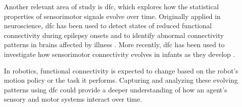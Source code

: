 Another relevant area of study is \ac{dfc}, which explores how the statistical properties of sensorimotor signals evolve over time. Originally applied in neuroscience, \ac{dfc} has been used to detect states of reduced functional connectivity during epilepsy onsets \cite{Christiaen2020Dynamicfunctionalconnectivity} and to identify abnormal connectivity patterns in brains affected by illness \cite{Zhou2020Earlychildhooddevelopmental}. More recently, \ac{dfc} has been used to investigate how sensorimotor connectivity evolves in  infants as they develop \cite{Kanazawa2023Openendedmovements}.

In robotics, functional connectivity is expected to change based on the robot’s motion policy or the task it performs. Capturing and analyzing these evolving patterns using \ac{dfc} could provide a deeper understanding of how an agent’s sensory and motor systems interact over time.

